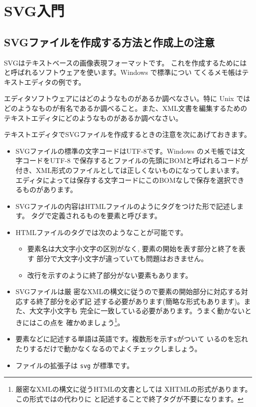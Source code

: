 \chapter{SVG入門}
\section{SVGファイルを作成する方法と作成上の注意}
SVGはテキストベースの画像表現フォーマットです。
これを作成するためには
と呼ばれるソフトウェアを使います。Windows で標準につい
てくるメモ帳はテキストエディタの例です。
\begin{Problem}\upshape
エディタソフトウェアにはどのようなものがあるか調べなさい。特に Unix では
 どのようなものが有名であるか調べること。また、XML文書を編集するための
 テキストエディタにどのようなものがあるか調べなさい。
\end{Problem}
テキストエディタでSVGファイルを作成するときの注意を次にあげておきます。
\begin{itemize}
 \item SVGファイルの標準の文字コードはUTF-8です。Windows のメモ帳では文
			 字コードをUTF-8 で保存するとファイルの先頭にBOMと呼ばれるコードが
			 付き、XML形式のファイルとしては正しくないものになってしまいます。
			 エディタによっては保存する文字コードにこのBOMなしで保存を選択でき
			 るものがあります。
 \item SVGファイルの内容はHTMLファイルのようにタグをつけた形で記述します。
       タグで定義されるものを要素と呼びます。
 \item HTMLファイルのタグでは次のようなことが可能です。
\begin{itemize}
 \item 要素名は大文字小文字の区別がなく, 要素の開始を表す部分と終了を表す
       部分で大文字小文字が違っていても問題はおきません。
 \item 改行を示すのように終了部分がない要素もあります。
\end{itemize}
 \item SVGファイルは厳
       密なXMLの構文に従うので要素の開始部分に対応する対応する終了部分を必ず記
       述する必要があります(簡略な形式もあります)。また、大文字小文字も
       完全に一致している必要があります。うまく動かないときにはこの点を
       確かめましょう\footnote{厳密なXMLの構文に従うHTMLの文書としては
       XHTMLの形式があります。この形式ではの代わりに
        と記述することで終了タグが不要になります。}。
 \item 要素などに記述する単語は英語です。複数形を示す\texttt{s}がついて
       いるのを忘れたりするだけで動かなくなるのでよくチェックしましょう。
 \item ファイルの拡張子は \texttt{svg} が標準です。
\end{itemize}

